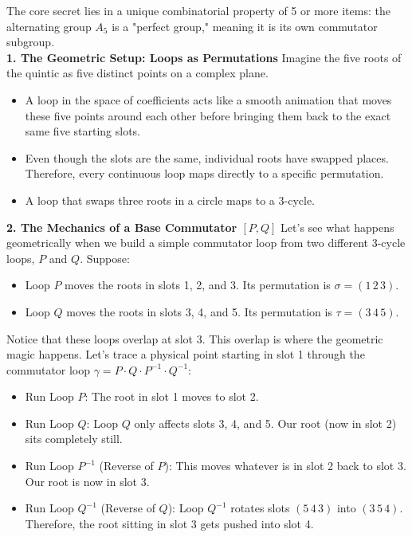 The core secret lies in a unique combinatorial property of 5 or more items: the alternating group \(A_{5}\) is a "perfect group," meaning it is its own commutator subgroup.\\

{\bf 1. The Geometric Setup: Loops as Permutations}
Imagine the five roots of the quintic as five distinct points on a complex plane.
\begin{itemize}
\item[]A loop in the space of coefficients acts like a smooth animation that moves these five points around each other before bringing them back to the exact same five starting slots.
\item[]Even though the slots are the same, individual roots have swapped places. Therefore, every continuous loop maps directly to a specific permutation.
\item[]A loop that swaps three roots in a circle maps to a 3-cycle.
\end{itemize}

{\bf 2. The Mechanics of a Base Commutator \([P, Q]\)}
Let's see what happens geometrically when we build a simple commutator loop from two different 3-cycle loops, \(P\) and \(Q\).
Suppose:
\begin{itemize}
\item[] Loop \(P\) moves the roots in slots 1, 2, and 3. Its permutation is \(\sigma = (1\,2\,3)\).
\item[]Loop \(Q\) moves the roots in slots 3, 4, and 5. Its permutation is \(\tau = (3\,4\,5)\).
\end{itemize}

Notice that these loops overlap at slot 3. This overlap is where the geometric magic happens. 
Let's trace a physical point starting in slot 1 through the commutator loop \(\gamma = P \cdot Q \cdot P^{-1} \cdot Q^{-1}\):
\begin{itemize}
\item[]Run Loop \(P\): The root in slot 1 moves to slot 2.
\item[]Run Loop \(Q\): Loop \(Q\) only affects slots 3, 4, and 5. Our root (now in slot 2) sits completely still.
\item[]Run Loop \(P^{-1}\) (Reverse of \(P\)): This moves whatever is in slot 2 back to slot 3. Our root is now in slot 3.
\item[]Run Loop \(Q^{-1}\) (Reverse of \(Q\)): Loop \(Q^{-1}\) rotates slots \((5\,4\,3)\) into \((3\,5\,4)\). Therefore, the root sitting in slot 3 gets pushed into slot 4.
\end{itemize}

